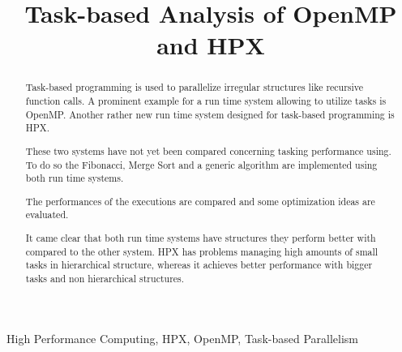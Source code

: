 \documentclass[conference]{IEEEtran}
\begin{document}
\title{Task-based Analysis of OpenMP and HPX}

\author{
}

\maketitle

\begin{abstract}
Task-based programming is used to parallelize irregular structures like recursive function calls.
A prominent example for a run time system allowing to utilize tasks is OpenMP.
Another rather new run time system designed for task-based programming is HPX.

These two systems have not yet been compared concerning tasking performance using.
To do so the Fibonacci, Merge Sort and a generic algorithm are implemented using both run time systems.

The performances of the executions are compared and some optimization ideas are evaluated.

It came clear that both run time systems have structures they perform better with compared to the other system.
HPX has problems managing high amounts of small tasks in hierarchical structure, whereas it achieves better performance with bigger tasks and non hierarchical structures.
\end{abstract}

\begin{IEEEkeywords}
High Performance Computing, HPX, OpenMP, Task-based Parallelism
\end{IEEEkeywords}


















{}
\end{document}
